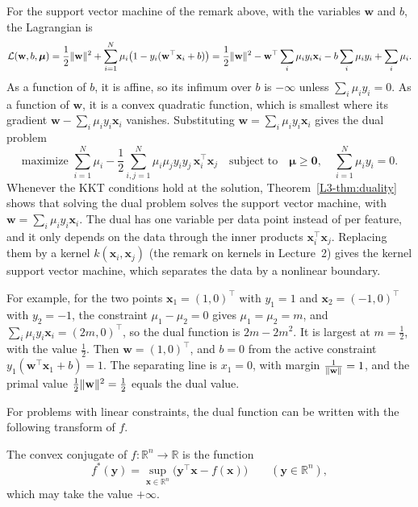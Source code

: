 \begin{example}\label{L3-ex:svm-dual}
    For the support vector machine of the remark above, with the variables $\mathbf{w}$ and $b$, the Lagrangian is
    \[\mathcal{L}(\mathbf{w}, b, \boldsymbol{\mu}) = \frac{1}{2}\lVert \mathbf{w} \rVert^2 + \sum_{i=1}^N \mu_i\big(1 - y_i(\mathbf{w}^\top\mathbf{x}_i + b)\big) = \frac{1}{2}\lVert \mathbf{w} \rVert^2 - \mathbf{w}^\top\sum_i \mu_iy_i\mathbf{x}_i - b\sum_i \mu_iy_i + \sum_i \mu_i.\]
    As a function of $b$, it is affine, so its infimum over $b$ is $-\infty$ unless $\sum_i \mu_iy_i = 0$. As a function of $\mathbf{w}$, it is a convex quadratic function, which is smallest where its gradient $\mathbf{w} - \sum_i \mu_iy_i\mathbf{x}_i$ vanishes. Substituting $\mathbf{w} = \sum_i \mu_iy_i\mathbf{x}_i$ gives the dual problem
    \[\text{maximize } \sum_{i=1}^N \mu_i - \frac{1}{2}\sum_{i, j = 1}^N \mu_i\mu_jy_iy_j\,\mathbf{x}_i^\top\mathbf{x}_j \quad \text{subject to} \quad \boldsymbol{\mu} \geq \mathbf{0}, \quad \sum_{i=1}^N \mu_iy_i = 0.\]
    Whenever the KKT conditions hold at the solution, Theorem~\ref{L3-thm:duality} shows that solving the dual problem solves the support vector machine, with $\mathbf{w} = \sum_i \mu_iy_i\mathbf{x}_i$. The dual has one variable per data point instead of per feature, and it only depends on the data through the inner products $\mathbf{x}_i^\top\mathbf{x}_j$. Replacing them by a kernel $k(\mathbf{x}_i, \mathbf{x}_j)$ (the remark on kernels in Lecture~2) gives the kernel support vector machine, which separates the data by a nonlinear boundary.

    For example, for the two points $\mathbf{x}_1 = (1, 0)^\top$ with $y_1 = 1$ and $\mathbf{x}_2 = (-1, 0)^\top$ with $y_2 = -1$, the constraint $\mu_1 - \mu_2 = 0$ gives $\mu_1 = \mu_2 = m$, and $\sum_i \mu_iy_i\mathbf{x}_i = (2m, 0)^\top$, so the dual function is $2m - 2m^2$. It is largest at $m = \frac{1}{2}$, with the value $\frac{1}{2}$. Then $\mathbf{w} = (1, 0)^\top$, and $b = 0$ from the active constraint $y_1(\mathbf{w}^\top\mathbf{x}_1 + b) = 1$. The separating line is $x_1 = 0$, with margin $\frac{1}{\lVert \mathbf{w} \rVert} = 1$, and the primal value $\frac{1}{2}\lVert \mathbf{w} \rVert^2 = \frac{1}{2}$ equals the dual value.
\end{example}

For problems with linear constraints, the dual function can be written with the following transform of $f$.

\begin{definition}\label{L3-def:conjugate}
    The convex conjugate of $f: \mathbb{R}^n \to \mathbb{R}$ is the function
    \[f^*(\mathbf{y}) = \sup_{\mathbf{x} \in \mathbb{R}^n} \big(\mathbf{y}^\top\mathbf{x} - f(\mathbf{x})\big) \qquad (\mathbf{y} \in \mathbb{R}^n),\]
    which may take the value $+\infty$.
\end{definition}

